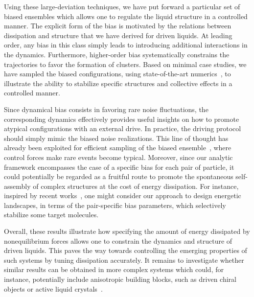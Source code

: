 \documentclass[superscriptaddress, twocolumn, prx, longbibliography, nofootinbib]{revtex4-1}
\begin{document}
Using these large-deviation techniques, we have put forward a particular set of biased ensembles which allows one to regulate the liquid structure in a controlled manner. The explicit form of the bias is motivated by the relations between dissipation and structure that we have derived for driven liquids. At leading order, any bias in this class simply leads to introducing additional interactions in the dynamics. Furthermore, higher-order bias systematically constrains the trajectories to favor the formation of clusters. Based on minimal case studies, we have sampled the biased configurations, using state-of-the-art numerics~\cite{Giadina2006, tailleur2007probing, Hurtado2009, Nemoto2016, Ray2018, Klymko2018, Brewer2018}, to illustrate the ability to stabilize specific structures and collective effects in a controlled manner. 


Since dynamical bias consists in favoring rare noise fluctuations, the corresponding dynamics effectively provides useful insights on how to promote atypical configurations with an external drive. In practice, the driving protocol should simply mimic the biased noise realizations. This line of thought has already been exploited for efficient sampling of the biased ensemble~\cite{Nemoto2016, Jack2017, Jack2018, Ferre2018}, where control forces make rare events become typical. Moreover, since our analytic framework encompasses the case of a specific bias for each pair of particle, it could potentially be regarded as a fruitful route to promote the spontaneous self-assembly of complex structures at the cost of energy dissipation. For instance, inspired by recent works~\cite{Murugan2015, Murugan2017b}, one might consider our approach to design energetic landscapes, in terms of the pair-specific bias parameters, which selectively stabilize some target molecules. 


Overall, these results illustrate how specifying the amount of energy dissipated by nonequilibrium forces allows one to constrain the dynamics and structure of driven liquids. This paves the way towards controlling the emerging properties of such systems by tuning dissipation accurately. It remains to investigate whether similar results can be obtained in more complex systems which could, for instance, potentially include anisotropic building blocks, such as driven chiral objects or active liquid crystals~\cite{Joshi2017, VanZuiden2016, Nguyen2014b}. 


\end{document}
